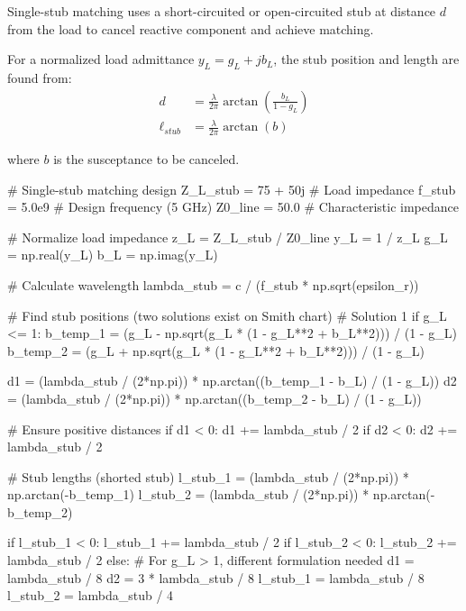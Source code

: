 \documentclass[11pt,a4paper]{article}
\begin{document}
Single-stub matching uses a short-circuited or open-circuited stub at distance $d$ from the load to cancel reactive component and achieve matching.

For a normalized load admittance $y_L = g_L + jb_L$, the stub position and length are found from:
\begin{align}
d &= \frac{\lambda}{2\pi} \arctan\left(\frac{b_L}{1 - g_L}\right) \\
\ell_{stub} &= \frac{\lambda}{2\pi} \arctan(b)
\end{align}

where $b$ is the susceptance to be canceled.

\begin{pycode}
# Single-stub matching design
Z_L_stub = 75 + 50j  # Load impedance
f_stub = 5.0e9  # Design frequency (5 GHz)
Z0_line = 50.0  # Characteristic impedance

# Normalize load impedance
z_L = Z_L_stub / Z0_line
y_L = 1 / z_L
g_L = np.real(y_L)
b_L = np.imag(y_L)

# Calculate wavelength
lambda_stub = c / (f_stub * np.sqrt(epsilon_r))

# Find stub positions (two solutions exist on Smith chart)
# Solution 1
if g_L <= 1:
    b_temp_1 = (g_L - np.sqrt(g_L * (1 - g_L**2 + b_L**2))) / (1 - g_L)
    b_temp_2 = (g_L + np.sqrt(g_L * (1 - g_L**2 + b_L**2))) / (1 - g_L)

    d1 = (lambda_stub / (2*np.pi)) * np.arctan((b_temp_1 - b_L) / (1 - g_L))
    d2 = (lambda_stub / (2*np.pi)) * np.arctan((b_temp_2 - b_L) / (1 - g_L))

    # Ensure positive distances
    if d1 < 0:
        d1 += lambda_stub / 2
    if d2 < 0:
        d2 += lambda_stub / 2

    # Stub lengths (shorted stub)
    l_stub_1 = (lambda_stub / (2*np.pi)) * np.arctan(-b_temp_1)
    l_stub_2 = (lambda_stub / (2*np.pi)) * np.arctan(-b_temp_2)

    if l_stub_1 < 0:
        l_stub_1 += lambda_stub / 2
    if l_stub_2 < 0:
        l_stub_2 += lambda_stub / 2
else:
    # For g_L > 1, different formulation needed
    d1 = lambda_stub / 8
    d2 = 3 * lambda_stub / 8
    l_stub_1 = lambda_stub / 8
    l_stub_2 = lambda_stub / 4


\end{pycode}
\end{document}

